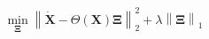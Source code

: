 \documentclass[preview]{standalone}
\begin{document}
\begin{align*}
\min_{\mathbf{\Xi}} \left\| \dot{\mathbf{X}} - \Theta(\mathbf{X}) \mathbf{\Xi} \right\|_2^2 + \lambda \left\| \mathbf{\Xi} \right\|_1
\end{align*}
\end{document}
